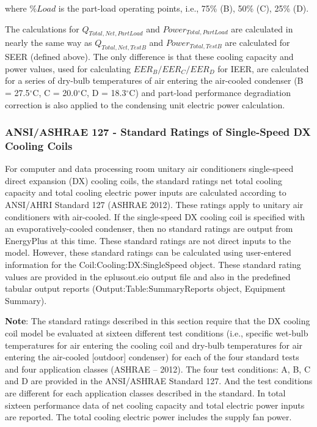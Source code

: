 where \(\% Load\) is the part-load operating points, i.e., 75\% (B), 50\% (C), 25\% (D).

The calculations for \(Q_{Total,Net,PartLoad}\) and \(Power_{Total,PartLoad}\) are calculated in nearly the same way as \(Q_{Total,Net,TestB}\) and \(Power_{Total,TestB}\) are calculated for SEER (defined above). The only difference is that these cooling capacity and power values, used for calculating \(EER_{B} / EER_{C} / EER_{D}\) for IEER, are calculated for a series of dry-bulb temperatures of air entering the air-cooled condenser (B = 27.5\(^{\circ}\)C, C = 20.0\(^{\circ}\)C, D = 18.3\(^{\circ}\)C) and part-load performance degradiation correction is also applied to the condensing unit electric power calculation.

\subsubsection{ANSI/ASHRAE 127 - Standard Ratings of Single-Speed DX Cooling Coils}\label{ansiashrae-127---standard-ratings-of-single-speed-dx-cooling-coils}

For computer and data processing room unitary air conditioners single-speed direct expansion (DX) cooling coils, the standard ratings net total cooling capacity and total cooling electric power inputs are calculated according to ANSI/AHRI Standard 127 (ASHRAE 2012). These ratings apply to unitary air conditioners with air-cooled. If the single-speed DX cooling coil is specified with an evaporatively-cooled condenser, then no standard ratings are output from EnergyPlus at this time. These standard ratings are not direct inputs to the model. However, these standard ratings can be calculated using user-entered information for the Coil:Cooling:DX:SingleSpeed object. These standard rating values are provided in the eplusout.eio output file and also in the predefined tabular output reports (Output:Table:SummaryReports object, Equipment Summary).

\textbf{Note}: The standard ratings described in this section require that the DX cooling coil model be evaluated at sixteen different test conditions (i.e., specific wet-bulb temperatures for air entering the cooling coil and dry-bulb temperatures for air entering the air-cooled {[}outdoor{]} condenser) for each of the four standard tests and four application classes (ASHRAE -- 2012). The four test conditions: A, B, C and D are provided in the ANSI/ASHRAE Standard 127. And the test conditions are different for each application classes described in the standard. In total sixteen performance data of net cooling capacity and total electric power inputs are reported. The total cooling electric power includes the supply fan power.

